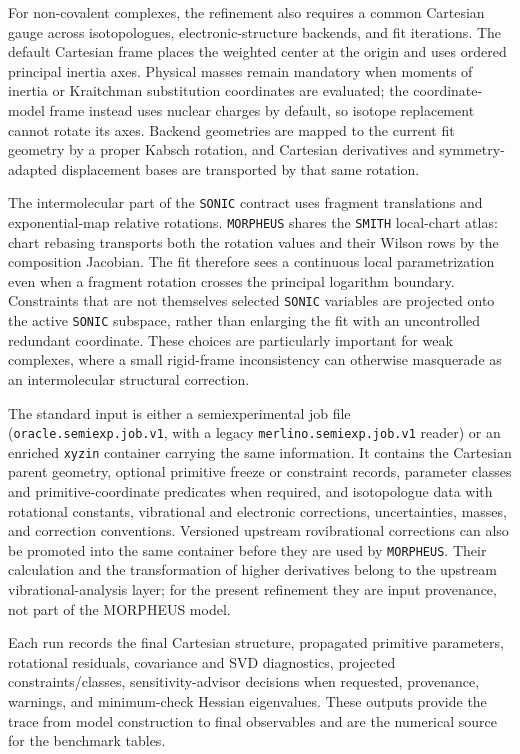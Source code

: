 \documentclass[aip,jcp,reprint,longbibliography,floatfix]{revtex4-2}
\begin{document}
For non-covalent complexes, the refinement also requires a common Cartesian
gauge across isotopologues, electronic-structure backends, and fit iterations.
The default Cartesian frame places the weighted center at the origin and uses
ordered principal inertia axes.  Physical masses remain mandatory when moments
of inertia or Kraitchman substitution coordinates are evaluated; the
coordinate-model frame instead uses nuclear charges by default, so isotope
replacement cannot rotate its axes.  Backend geometries are mapped to the
current fit geometry by a proper Kabsch rotation, and Cartesian derivatives and
symmetry-adapted displacement bases are transported by that same rotation.

The intermolecular part of the \texttt{SONIC} contract uses fragment
translations and exponential-map relative rotations.  \texttt{MORPHEUS}
shares the \texttt{SMITH} local-chart atlas: chart rebasing transports both the
rotation values and their Wilson rows by the composition Jacobian.  The fit
therefore sees a continuous local parametrization even when a fragment
rotation crosses the principal logarithm boundary.  Constraints that are not
themselves selected \texttt{SONIC} variables are projected onto the active
\texttt{SONIC} subspace, rather than enlarging the fit with an uncontrolled
redundant coordinate.  These choices are particularly important for weak
complexes, where a small rigid-frame inconsistency can otherwise masquerade as
an intermolecular structural correction.

The standard input is either a semiexperimental job file
(\texttt{oracle.semiexp.job.v1}, with a legacy
\texttt{merlino.semiexp.job.v1} reader) or an enriched \texttt{xyzin}
container carrying the same information. It contains the Cartesian parent
geometry, optional primitive freeze or constraint records, parameter classes
and primitive-coordinate predicates when required, and isotopologue data with
rotational constants, vibrational and electronic corrections, uncertainties,
masses, and correction conventions. Versioned upstream rovibrational
corrections can also be promoted into the same container before they are used
by \texttt{MORPHEUS}. Their calculation and the transformation of higher
derivatives belong to the upstream vibrational-analysis layer; for the present
refinement they are input provenance, not part of the MORPHEUS model.

Each run records the final Cartesian structure, propagated primitive
parameters, rotational residuals, covariance and SVD diagnostics, projected
constraints/classes, sensitivity-advisor decisions when requested, provenance,
warnings, and minimum-check Hessian eigenvalues. These outputs provide the
trace from model construction to final observables and are the numerical
source for the benchmark tables.
\end{document}
